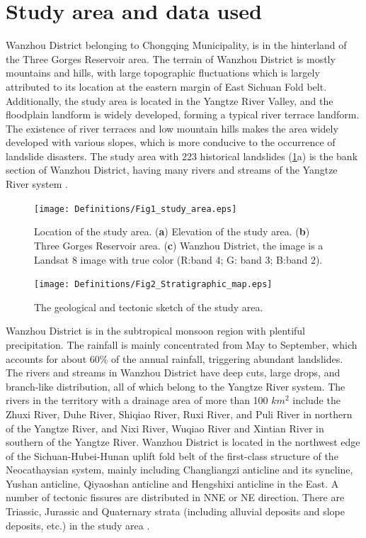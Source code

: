 \documentclass[a4paper,fleqn]{cas-sc}
\begin{document}
\section{Study area and data used}

Wanzhou District belonging to Chongqing Municipality, is in the hinterland of the Three Gorges Reservoir area. 
The terrain of Wanzhou District is mostly mountains and hills, with large topographic fluctuations which is largely attributed to its location at the eastern margin of East Sichuan Fold belt. 
Additionally, the study area is located in the Yangtze River Valley, and the floodplain landform is widely developed, forming a typical river terrace landform. The existence of river terraces and low mountain hills makes the area widely developed with various slopes, which is more conducive to the occurrence of landslide disasters.
The study area with 223 historical landslides (\ref{StudyArea}a) is the bank section of Wanzhou District, having many rivers and streams of the Yangtze River system \citep{Yu2016IJERPH,Song2018}. 

\begin{figure}
  \centering
  \texttt{[image: Definitions/Fig1\_study\_area.eps]}
  \caption{Location of the study area. (\textbf{a}) Elevation of the study area. (\textbf{b}) Three Gorges Reservoir area. (\textbf{c}) Wanzhou District, the image is a Landsat 8 image with true color (R:band 4; G: band 3; B:band 2).}
  \label{StudyArea}
\end{figure}  
  
\begin{figure}
  \centering
  \texttt{[image: Definitions/Fig2\_Stratigraphic\_map.eps]}
  \caption{The geological and tectonic sketch of the study area.}
  \label{Fig_Lithology}
\end{figure} 

Wanzhou District is in the subtropical monsoon region with plentiful precipitation. 
The rainfall is mainly concentrated from May to September, which accounts for about 60\% of the annual rainfall, triggering abundant landslides. 
The rivers and streams in Wanzhou District have deep cuts, large drops, and branch-like distribution, all of which belong to the Yangtze River system. 
The rivers in the territory with a drainage area of more than 100 $km^{2}$ include the Zhuxi River, Duhe River, Shiqiao River, Ruxi River, and Puli River in northern of the Yangtze River, and Nixi River, Wuqiao River and Xintian River in southern of the Yangtze River. 
Wanzhou District is located in the northwest edge of the Sichuan-Hubei-Hunan uplift fold belt of the first-class structure of the Neocathaysian system, mainly including Changliangzi anticline and its syncline, Yushan anticline, Qiyaoshan anticline and Hengshixi anticline in the East. 
A number of tectonic fissures are distributed in NNE or NE direction. There are Triassic, Jurassic and Quaternary strata (including alluvial deposits and slope deposits, etc.) in the study area \citep{Song2018}. 
\end{document}
